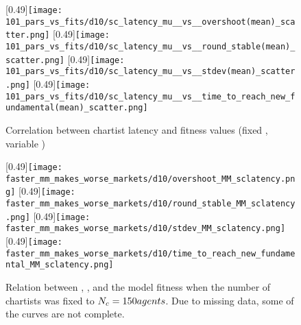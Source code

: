 \begin{figure}
	\centering
	[0.49\linewidth]{\texttt{[image: 101\_pars\_vs\_fits/d10/sc\_latency\_mu\_\_vs\_\_overshoot(mean)\_scatter.png]}}
	[0.49\linewidth]{\texttt{[image: 101\_pars\_vs\_fits/d10/sc\_latency\_mu\_\_vs\_\_round\_stable(mean)\_scatter.png]}}
	[0.49\linewidth]{\texttt{[image: 101\_pars\_vs\_fits/d10/sc\_latency\_mu\_\_vs\_\_stdev(mean)\_scatter.png]}}
	[0.49\linewidth]{\texttt{[image: 101\_pars\_vs\_fits/d10/sc\_latency\_mu\_\_vs\_\_time\_to\_reach\_new\_fundamental(mean)\_scatter.png]}}
	\caption{Correlation between chartist latency and fitness values (fixed \scnAgents, variable \ssmmnAgents)}
	\label{fig:d10_parvfit_sclatencymu}
\end{figure}

\begin{figure}
	\centering
	\subcaptionbox{\label{fig:faster_mm_makes_worse_markets/d10/overshoot_MM_sclatency}}
	[0.49\linewidth]{\texttt{[image: faster\_mm\_makes\_worse\_markets/d10/overshoot\_MM\_sclatency.png]}}
	\subcaptionbox{\label{fig:faster_mm_makes_worse_markets/d10/round_stable_MM_sclatency}}
	[0.49\linewidth]{\texttt{[image: faster\_mm\_makes\_worse\_markets/d10/round\_stable\_MM\_sclatency.png]}}
	\subcaptionbox{\label{fig:faster_mm_makes_worse_markets/d10/stdev_MM_sclatency}}
	[0.49\linewidth]{\texttt{[image: faster\_mm\_makes\_worse\_markets/d10/stdev\_MM\_sclatency.png]}}
	\subcaptionbox{\label{fig:faster_mm_makes_worse_markets/d10/time_to_reach_new_fundamental_MM_sclatency}}
	[0.49\linewidth]{\texttt{[image: faster\_mm\_makes\_worse\_markets/d10/time\_to\_reach\_new\_fundamental\_MM\_sclatency.png]}}
	\caption{Relation between \ssmmnAgents, \sclatencymu, and the model fitness when the number of chartists was fixed to $N_{c} = 150 agents$. Due to missing data, some of the curves are not complete.}
	\label{fig:faster_mm_makes_worse_markets/d10/MM_sclatency}
\end{figure}




